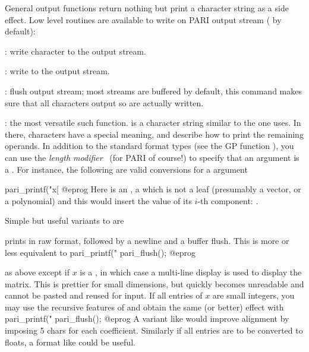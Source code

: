 
General output functions return nothing but print a character string as a
side effect. Low level routines are available to write on PARI output stream
 ( by default):

: write character  to the output stream.

: write  to the output stream.

: flush output stream; most streams are buffered by
default, this command makes sure that all characters output so are actually
written.

: the most versatile such
function.  is a character string similar to the one
 uses. In there, \kbd{\%} characters have a special meaning, and
describe how to print the remaining operands. In addition to the standard
format types (see the GP function ), you can use the \emph{length
modifier}~ (for PARI of course!) to specify that an argument is a
. For instance, the following are valid conversions for a 
argument
\bprog

    pari_printf("x[%
@eprog\noindent
Here  is an ,  a  which is not a leaf
(presumably a vector, or a polynomial) and this would insert the value of its
$i$-th  component: .

\noindent Simple but useful variants to  are

 prints  in raw format, followed by a
newline and a buffer flush. This is more or less equivalent to
\bprog
    pari_printf("%
    pari_flush();
@eprog

 as above except if $x$ is a , in which
case a multi-line display is used to display the matrix. This is prettier for
small dimensions, but quickly becomes unreadable and cannot be pasted and
reused for input. If all entries of $x$ are small integers, you may use the
recursive features of  and obtain the same (or better) effect with
\bprog
    pari_printf("%
    pari_flush();
@eprog\noindent
A variant like  would improve alignment by imposing
5 chars for each coefficient. Similarly if all entries are to be converted to
floats, a format like  could be useful.


